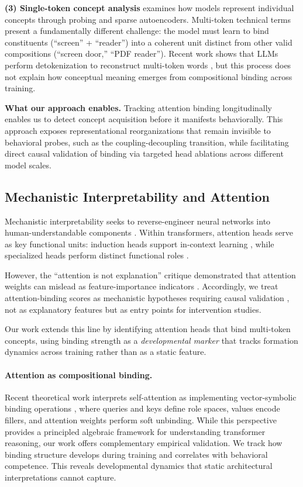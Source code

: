 \documentclass[10pt]{article} %
\begin{document}
\textbf{(3) Single-token concept analysis} \citep{burns2022discovering,cunningham2023sparse} examines how models represent individual concepts through probing and sparse autoencoders.
Multi-token technical terms present a fundamentally different challenge: the model must learn to bind constituents (``screen'' + ``reader'') into a coherent unit distinct from other valid compositions (``screen door,'' ``PDF reader'').
Recent work shows that LLMs perform detokenization to reconstruct multi-token words \citep{kaplan2025from}, but this process does not explain how conceptual meaning emerges from compositional binding across training.

\textbf{What our approach enables.}
Tracking attention binding longitudinally enables us to detect concept acquisition before it manifests behaviorally. This approach exposes representational reorganizations that remain invisible to behavioral probes, such as the coupling-decoupling transition, while facilitating direct causal validation of binding via targeted head ablations across different model scales.

\subsection{Mechanistic Interpretability and Attention}

Mechanistic interpretability seeks to reverse-engineer neural networks into human-understandable components \citep{olah2020zoom,elhage2021transformer}.
Within transformers, attention heads serve as key functional units: induction heads support in-context learning \citep{olsson2022context}, while specialized heads perform distinct functional roles \citep{voita2019analyzing}.

However, the ``attention is not explanation'' critique demonstrated that attention weights can mislead as feature-importance indicators \citep{jain2019attention,wiegreffe2019attention}.
Accordingly, we treat attention-binding scores as mechanistic hypotheses requiring causal validation \citep{olsson2022context}, not as explanatory features but as entry points for intervention studies.

Our work extends this line by identifying attention heads that bind multi-token concepts, using binding strength as a \emph{developmental marker} that tracks formation dynamics across training rather than as a static feature.

\paragraph{Attention as compositional binding.}
Recent theoretical work interprets self-attention as implementing vector-symbolic binding operations \citep{dhayalkar2025attention}, where queries and keys define role spaces, values encode fillers, and attention weights perform soft unbinding.
While this perspective provides a principled algebraic framework for understanding transformer reasoning, our work offers complementary empirical validation. We track how binding structure develops during training and correlates with behavioral competence. This reveals developmental dynamics that static architectural interpretations cannot capture.
\end{document}
